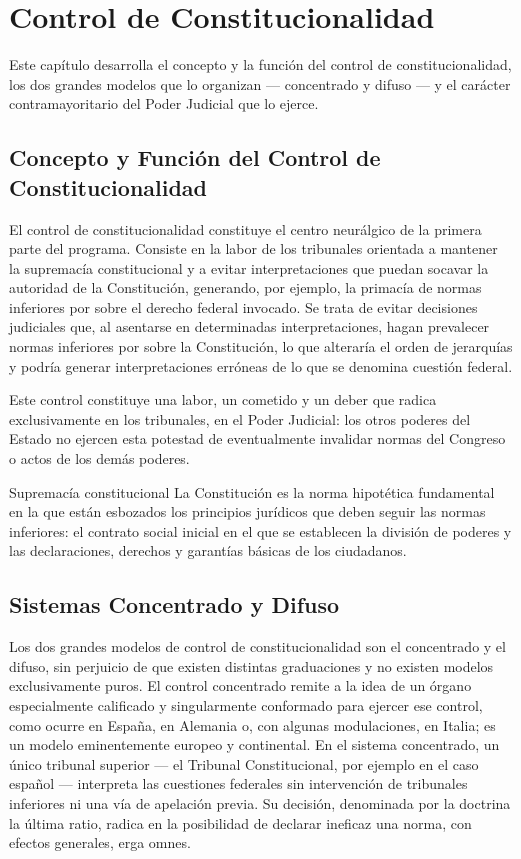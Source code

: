 \documentclass[12pt,oneside]{book}
\begin{document}
\chapter{Control de Constitucionalidad}

Este capítulo desarrolla el concepto y la función del control de constitucionalidad, los dos grandes modelos que lo organizan --- concentrado y difuso --- y el carácter contramayoritario del Poder Judicial que lo ejerce.

\section{Concepto y Función del Control de Constitucionalidad}

El control de constitucionalidad constituye el centro neurálgico de la primera parte del programa. Consiste en la labor de los tribunales orientada a mantener la supremacía constitucional y a evitar interpretaciones que puedan socavar la autoridad de la Constitución, generando, por ejemplo, la primacía de normas inferiores por sobre el derecho federal invocado. Se trata de evitar decisiones judiciales que, al asentarse en determinadas interpretaciones, hagan prevalecer normas inferiores por sobre la Constitución, lo que alteraría el orden de jerarquías y podría generar interpretaciones erróneas de lo que se denomina cuestión federal.

Este control constituye una labor, un cometido y un deber que radica exclusivamente en los tribunales, en el Poder Judicial: los otros poderes del Estado no ejercen esta potestad de eventualmente invalidar normas del Congreso o actos de los demás poderes.

\begin{definition}{Supremacía constitucional}
La Constitución es la norma hipotética fundamental en la que están esbozados los principios jurídicos que deben seguir las normas inferiores: el contrato social inicial en el que se establecen la división de poderes y las declaraciones, derechos y garantías básicas de los ciudadanos.
\end{definition}

\section{Sistemas Concentrado y Difuso}

Los dos grandes modelos de control de constitucionalidad son el concentrado y el difuso, sin perjuicio de que existen distintas graduaciones y no existen modelos exclusivamente puros. El control concentrado remite a la idea de un órgano especialmente calificado y singularmente conformado para ejercer ese control, como ocurre en España, en Alemania o, con algunas modulaciones, en Italia; es un modelo eminentemente europeo y continental. En el sistema concentrado, un único tribunal superior --- el Tribunal Constitucional, por ejemplo en el caso español --- interpreta las cuestiones federales sin intervención de tribunales inferiores ni una vía de apelación previa. Su decisión, denominada por la doctrina la última ratio, radica en la posibilidad de declarar ineficaz una norma, con efectos generales, erga omnes.
\end{document}
